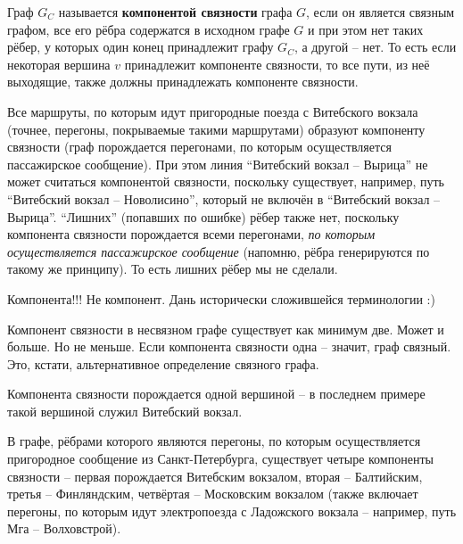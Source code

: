 \begin{definition} \label{cc}
	Граф $G_C$ называется \textbf{компонентой связности} графа $G$, если он является связным графом, все его рёбра содержатся в исходном графе $G$ и при этом нет таких рёбер, у которых один конец принадлежит графу $G_C$, а другой -- нет. То есть если некоторая вершина $v$ принадлежит компоненте связности, то все пути, из неё выходящие, также должны принадлежать компоненте связности.
\end{definition}

\begin{example}
	Все маршруты, по которым идут пригородные поезда с Витебского вокзала (точнее, перегоны, покрываемые такими маршрутами) образуют компоненту связности (граф порождается перегонами, по которым осуществляется пассажирское сообщение). При этом линия ``Витебский вокзал -- Вырица'' не может считаться компонентой связности, поскольку существует, например, путь ``Витебский вокзал -- Новолисино'', который не включён в ``Витебский вокзал -- Вырица''. ``Лишних'' (попавших по ошибке) рёбер также нет, поскольку компонента связности порождается всеми перегонами, \textit{по которым осуществляется пассажирское сообщение} (напомню, рёбра генерируются по такому же принципу). То есть лишних рёбер мы не сделали.
\end{example}

\begin{remark}
	Компонента!!! Не компонент. Дань исторически сложившейся терминологии :)
\end{remark}

\begin{remark}
	Компонент связности в несвязном графе существует как минимум две. Может и больше. Но не меньше. Если компонента связности одна -- значит, граф связный. Это, кстати, альтернативное определение связного графа.
\end{remark}

\begin{remark}
	Компонента связности порождается одной вершиной -- в последнем примере такой вершиной служил Витебский вокзал.
\end{remark}

\begin{example}
	В графе, рёбрами которого являются перегоны, по которым осуществляется пригородное сообщение из Санкт-Петербурга, существует четыре компоненты связности -- первая порождается Витебским вокзалом, вторая -- Балтийским, третья -- Финляндским, четвёртая -- Московским вокзалом (также включает перегоны, по которым идут электропоезда с Ладожского вокзала -- например, путь Мга -- Волховстрой).
\end{example}

